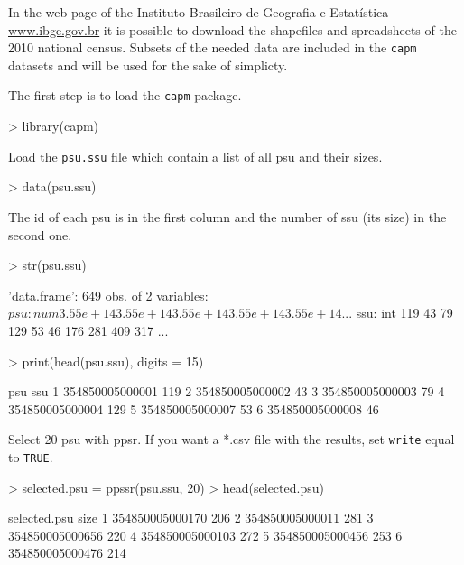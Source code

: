 \documentclass[a4paper]{article}
\begin{document}
In the web page of the Instituto Brasileiro de Geografia e Estat\'{i}stica \url{www.ibge.gov.br} it is possible to download the shapefiles and spreadsheets of the 2010 national census. Subsets of the needed data are included in the \texttt{capm} datasets and will be used for the sake of simplicty.

The first step is to load the \texttt{capm} package.
\begin{Schunk}
\begin{Sinput}
> library(capm)
\end{Sinput}
\end{Schunk}


Load the \texttt{psu.ssu} file which contain a list of all psu and their sizes.
\begin{Schunk}
\begin{Sinput}
> data(psu.ssu)
\end{Sinput}
\end{Schunk}

The id of each psu is in the first column and the number of ssu (its size) in the second one.

\begin{Schunk}
\begin{Sinput}
> str(psu.ssu)
\end{Sinput}
\begin{Soutput}
'data.frame':	649 obs. of  2 variables:
 $ psu: num  3.55e+14 3.55e+14 3.55e+14 3.55e+14 3.55e+14 ...
 $ ssu: int  119 43 79 129 53 46 176 281 409 317 ...
\end{Soutput}
\begin{Sinput}
> print(head(psu.ssu), digits = 15)
\end{Sinput}
\begin{Soutput}
              psu ssu
1 354850005000001 119
2 354850005000002  43
3 354850005000003  79
4 354850005000004 129
5 354850005000007  53
6 354850005000008  46
\end{Soutput}
\end{Schunk}

Select 20 psu with ppsr. If you want a *.csv file with the results, set \texttt{write} equal to \texttt{TRUE}.
\begin{Schunk}
\begin{Sinput}
> selected.psu = ppssr(psu.ssu, 20)
> head(selected.psu)
\end{Sinput}
\begin{Soutput}
     selected.psu size
1 354850005000170  206
2 354850005000011  281
3 354850005000656  220
4 354850005000103  272
5 354850005000456  253
6 354850005000476  214
\end{Soutput}
\end{Schunk}
\end{document}
